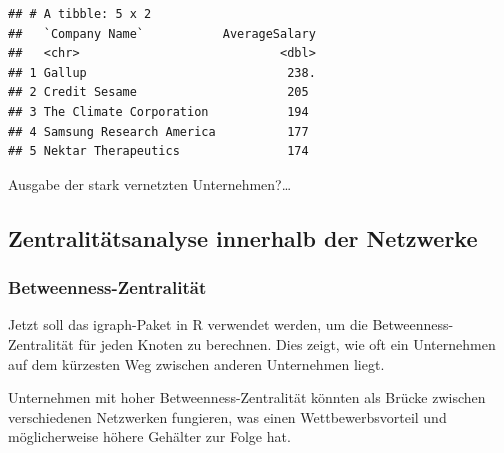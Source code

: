 \documentclass[
]{article}
\newenvironment{Shaded}{\begin{snugshade}}{\end{snugshade}}
\newcommand{\AttributeTok}[1]{\textcolor[rgb]{0.13,0.29,0.53}{#1}}
\newcommand{\CommentTok}[1]{\textcolor[rgb]{0.56,0.35,0.01}{\textit{#1}}}
\newcommand{\FunctionTok}[1]{\textcolor[rgb]{0.13,0.29,0.53}{\textbf{#1}}}
\newcommand{\NormalTok}[1]{#1}
\newcommand{\OtherTok}[1]{\textcolor[rgb]{0.56,0.35,0.01}{#1}}
\newcommand{\SpecialCharTok}[1]{\textcolor[rgb]{0.81,0.36,0.00}{\textbf{#1}}}
\newcommand{\StringTok}[1]{\textcolor[rgb]{0.31,0.60,0.02}{#1}}
\begin{document}
\begin{verbatim}
## # A tibble: 5 x 2
##   `Company Name`           AverageSalary
##   <chr>                            <dbl>
## 1 Gallup                            238.
## 2 Credit Sesame                     205 
## 3 The Climate Corporation           194 
## 4 Samsung Research America          177 
## 5 Nektar Therapeutics               174
\end{verbatim}

Ausgabe der stark vernetzten Unternehmen?\ldots{}

\subsection{Zentralitätsanalyse innerhalb der
Netzwerke}\label{zentralituxe4tsanalyse-innerhalb-der-netzwerke}

\begin{Shaded}
\end{Shaded}

\subsubsection{Betweenness-Zentralität}\label{betweenness-zentralituxe4t}

Jetzt soll das igraph-Paket in R verwendet werden, um die
Betweenness-Zentralität für jeden Knoten zu berechnen. Dies zeigt, wie
oft ein Unternehmen auf dem kürzesten Weg zwischen anderen Unternehmen
liegt.

Unternehmen mit hoher Betweenness-Zentralität könnten als Brücke
zwischen verschiedenen Netzwerken fungieren, was einen
Wettbewerbsvorteil und möglicherweise höhere Gehälter zur Folge hat.
\end{document}
